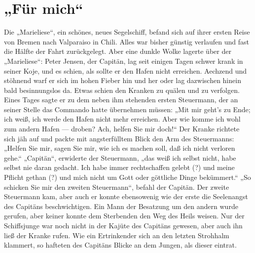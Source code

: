 \chapter[Für mich]{„Für mich“}

Die „Marieliese“, ein schönes, neues Segelschiff, befand sich auf ihrer ersten Reise von Bremen nach Valparaiso in Chili. Alles war bisher günstig verlaufen und fast die Hälfte der Fahrt zurückgelegt. Aber eine dunkle Wolke lagerte über der „Marieliese“: Peter Jensen, der Capitän, lag seit einigen Tagen schwer krank in seiner Koje, und es schien, als sollte er den Hafen nicht erreichen. Aechzend und stöhnend warf er sich im hohen Fieber hin und her oder lag dazwischen hinein bald besinnungslos da. Etwas schien den Kranken zu quälen und zu verfolgen. Eines Tages sagte er zu dem neben ihm stehenden ersten Steuermann, der an seiner Stelle das Commando hatte übernehmen müssen: „Mit mir geht’s zu Ende; ich weiß, ich werde den Hafen nicht mehr erreichen. Aber wie komme ich wohl zum andern Hafen — droben? Ach, helfen Sie mir doch!“ Der Kranke richtete sich jäh auf und packte mit angsterfülltem Blick den Arm des Steuermanns: „Helfen Sie mir, sagen Sie mir, wie ich es machen soll, daß ich nicht verloren gehe.“ „Capitän“, erwiderte der Steuermann, „das weiß ich selbst nicht, habe selbst nie daran gedacht. Ich habe immer rechtschaffen gelebt (?) und meine Pflicht gethan (?) und mich nicht um Gott oder göttliche Dinge bekümmert.“ „So schicken Sie mir den zweiten Steuermann“, befahl der Capitän. Der zweite Steuermann kam, aber auch er konnte ebensowenig wie der erste die Seelenangst des Capitäns beschwichtigen. Ein Mann der Besatzung um den andern wurde gerufen, aber keiner konnte dem Sterbenden den Weg des Heils weisen. Nur der Schiffsjunge war noch nicht in der Kajüte des Capitäns gewesen, aber auch ihn ließ der Kranke rufen. Wie ein Ertrinkender sich an den letzten Strohhalm klammert, so hafteten des Capitäns Blicke an dem Jungen, als dieser eintrat.


